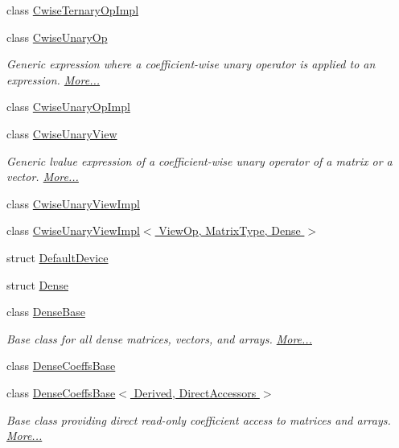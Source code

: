 \begin{DoxyCompactItemize}
class \hyperlink{class_eigen_1_1_cwise_ternary_op_impl}{Cwise\+Ternary\+Op\+Impl}
\item 
class \hyperlink{group___core___module_class_eigen_1_1_cwise_unary_op}{Cwise\+Unary\+Op}
\begin{DoxyCompactList}\small\item\em Generic expression where a coefficient-\/wise unary operator is applied to an expression.  \hyperlink{group___core___module_class_eigen_1_1_cwise_unary_op}{More...}\end{DoxyCompactList}\item 
class \hyperlink{class_eigen_1_1_cwise_unary_op_impl}{Cwise\+Unary\+Op\+Impl}
\item 
class \hyperlink{group___core___module_class_eigen_1_1_cwise_unary_view}{Cwise\+Unary\+View}
\begin{DoxyCompactList}\small\item\em Generic lvalue expression of a coefficient-\/wise unary operator of a matrix or a vector.  \hyperlink{group___core___module_class_eigen_1_1_cwise_unary_view}{More...}\end{DoxyCompactList}\item 
class \hyperlink{class_eigen_1_1_cwise_unary_view_impl}{Cwise\+Unary\+View\+Impl}
\item 
class \hyperlink{class_eigen_1_1_cwise_unary_view_impl_3_01_view_op_00_01_matrix_type_00_01_dense_01_4}{Cwise\+Unary\+View\+Impl$<$ View\+Op, Matrix\+Type, Dense $>$}
\item 
struct \hyperlink{struct_eigen_1_1_default_device}{Default\+Device}
\item 
struct \hyperlink{struct_eigen_1_1_dense}{Dense}
\item 
class \hyperlink{group___core___module_class_eigen_1_1_dense_base}{Dense\+Base}
\begin{DoxyCompactList}\small\item\em Base class for all dense matrices, vectors, and arrays.  \hyperlink{group___core___module_class_eigen_1_1_dense_base}{More...}\end{DoxyCompactList}\item 
class \hyperlink{class_eigen_1_1_dense_coeffs_base}{Dense\+Coeffs\+Base}
\item 
class \hyperlink{group___core___module_class_eigen_1_1_dense_coeffs_base_3_01_derived_00_01_direct_accessors_01_4}{Dense\+Coeffs\+Base$<$ Derived, Direct\+Accessors $>$}
\begin{DoxyCompactList}\small\item\em Base class providing direct read-\/only coefficient access to matrices and arrays.  \hyperlink{group___core___module_class_eigen_1_1_dense_coeffs_base_3_01_derived_00_01_direct_accessors_01_4}{More...}\end{DoxyCompactList}\item 

\end{DoxyCompactItemize}
